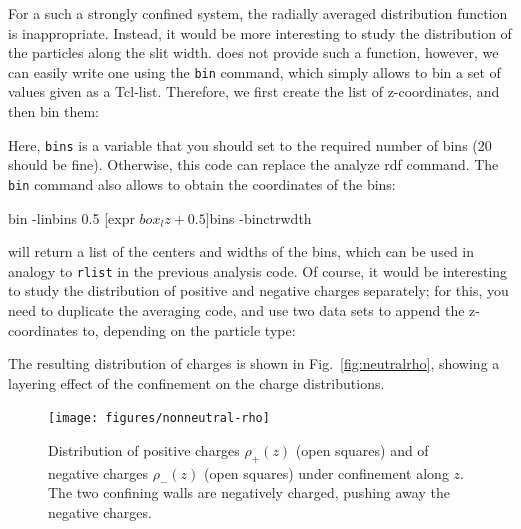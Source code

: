 \documentclass[
a4paper,                        %
11pt,                           %
twoside,                        %
footsepline,                    %
headsepline,                    %
headexclude,                    %
footexclude,                    %
pagesize,                       %
]{scrartcl}
\begin{document}
For a such a strongly confined system, the radially averaged
distribution function is inappropriate. Instead, it would be more
interesting to study the distribution of the particles along the slit
width. \es{}  does not provide such a function, however, we can easily
write one using the \verb|bin| command, which simply allows to bin a
set of values given as a Tcl-list. Therefore, we first create the list
of z-coordinates, and then bin them:


Here, \verb|bins| is a variable that you should set to the required
number of bins (20 should be fine). Otherwise, this code can replace
the analyze rdf command. The \verb|bin| command also allows to obtain
the coordinates of the bins:

\begin{tclcode}
  bin -linbins 0.5 [expr $box_lz + 0.5] $bins -binctrwdth
\end{tclcode}

will return a list of the centers and widths of the bins, which can be
used in analogy to \verb|rlist| in the previous analysis code. Of
course, it would be interesting to study the distribution of positive
and negative charges separately; for this, you need to duplicate the
averaging code, and use two data sets to append the z-coordinates to,
depending on the particle type:


The resulting distribution of charges is shown in
Fig.~\ref{fig:neutralrho}, showing a layering effect of the
confinement on the charge distributions.

\begin{figure}[t]
  \centering
  \texttt{[image: figures/nonneutral-rho]}
  \caption{Distribution of positive charges $\rho_+(z)$ (open squares)
    and of negative charges $\rho_-(z)$ (open squares) under
    confinement along $z$. The two confining walls are negatively
    charged, pushing away the negative charges.}
  \label{fig:nonneutralrho}
\end{figure}
\end{document}
